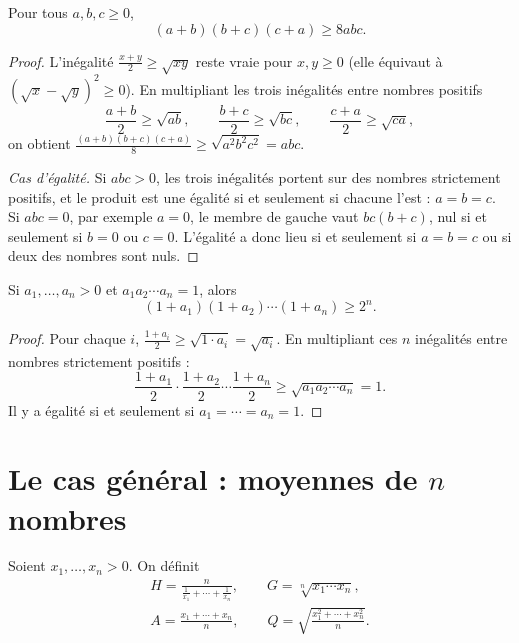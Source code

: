 \documentclass[11pt]{article}
\begin{document}
\begin{exemple}\label{exm:E2}
Pour tous $a, b, c \geqslant 0$,
\[
(a+b)(b+c)(c+a) \geqslant 8abc .
\]
\end{exemple}

\begin{proof}
L'inégalité $\frac{x+y}{2} \geqslant \sqrt{xy}$ reste vraie pour
$x, y \geqslant 0$ (elle équivaut à $(\sqrt x - \sqrt y)^2 \geqslant 0$). En
multipliant les trois inégalités entre nombres positifs
\[
\frac{a+b}{2} \geqslant \sqrt{ab}, \qquad
\frac{b+c}{2} \geqslant \sqrt{bc}, \qquad
\frac{c+a}{2} \geqslant \sqrt{ca},
\]
on obtient $\frac{(a+b)(b+c)(c+a)}{8} \geqslant \sqrt{a^2b^2c^2} = abc$.

\emph{Cas d'égalité.} Si $abc > 0$, les trois inégalités portent sur des
nombres strictement positifs, et le produit est une égalité si et seulement
si chacune l'est : $a = b = c$. Si $abc = 0$, par exemple $a = 0$, le membre
de gauche vaut $bc(b + c)$, nul si et seulement si $b = 0$ ou $c = 0$.
L'égalité a donc lieu si et seulement si $a = b = c$ ou si deux des nombres
sont nuls.
\end{proof}

\begin{exemple}\label{exm:E3}
Si $a_1, \ldots, a_n > 0$ et $a_1 a_2 \cdots a_n = 1$, alors
\[
(1 + a_1)(1 + a_2) \cdots (1 + a_n) \geqslant 2^n .
\]
\end{exemple}

\begin{proof}
Pour chaque $i$, $\frac{1 + a_i}{2} \geqslant \sqrt{1 \cdot a_i} = \sqrt{a_i}$.
En multipliant ces $n$ inégalités entre nombres strictement positifs :
\[
\frac{1 + a_1}{2} \cdot \frac{1 + a_2}{2} \cdots \frac{1 + a_n}{2}
\geqslant \sqrt{a_1 a_2 \cdots a_n} = 1 .
\]
Il y a égalité si et seulement si $a_1 = \cdots = a_n = 1$.
\end{proof}

\section{Le cas général : moyennes de \texorpdfstring{$n$}{n} nombres}\label{sec:moyennes-n-nombres}

\begin{definition}
Soient $x_1, \ldots, x_n > 0$. On définit
\begin{gather*}
H = \frac{n}{\frac{1}{x_1} + \cdots + \frac{1}{x_n}}, \qquad
G = \sqrt[n]{x_1 \cdots x_n}, \\
A = \frac{x_1 + \cdots + x_n}{n}, \qquad
Q = \sqrt{\frac{x_1^2 + \cdots + x_n^2}{n}} .
\end{gather*}
\end{definition}
\end{document}
